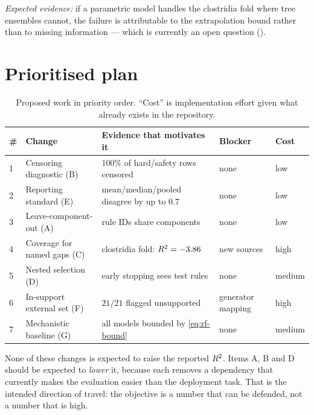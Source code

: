 \emph{Expected evidence:} if a parametric model handles the clostridia fold
where tree ensembles cannot, the failure is attributable to the
extrapolation bound rather than to missing information --- which is
currently an open question ().

\section{Prioritised plan}

\begin{table}[htbp]\centering\small
\caption{Proposed work in priority order. ``Cost'' is implementation
effort given what already exists in the repository.}
\label{tab:plan}
\begin{tabular}{p{0.4cm}p{3.5cm}p{4.3cm}p{2.3cm}p{1.6cm}}
\toprule
\# & Change & Evidence that motivates it & Blocker & Cost \\
\midrule
1 & Censoring diagnostic (B) & $100\%$ of hard/safety rows censored & none & low \\
2 & Reporting standard (E) & mean/median/pooled disagree by up to $0.7$ & none & low \\
3 & Leave-component-out (A) & rule IDs share components & none & low \\
4 & Coverage for named gaps (C) & clostridia fold: $R^2 = -3.86$ & new sources & high \\
5 & Nested selection (D) & early stopping sees test rules & none & medium \\
6 & In-support external set (F) & $21/21$ flagged unsupported & generator mapping & high \\
7 & Mechanistic baseline (G) & all models bounded by \cref{eq:rf-bound} & none & medium \\
\bottomrule
\end{tabular}
\end{table}

\begin{limitbox}[title=No performance promises]
None of these changes is expected to raise the reported $R^2$. Items A,
B and D should be expected to \emph{lower} it, because each removes a
dependency that currently makes the evaluation easier than the deployment
task. That is the intended direction of travel: the objective is a number
that can be defended, not a number that is high.
\end{limitbox}
